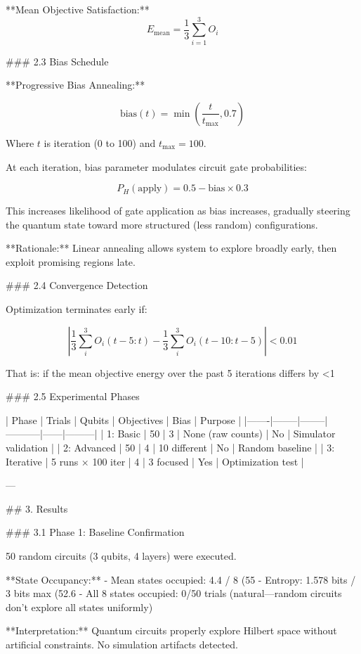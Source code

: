 **Mean Objective Satisfaction:**
\[E_{\text{mean}} = \frac{1}{3} \sum_{i=1}^{3} O_i\]

### 2.3 Bias Schedule

**Progressive Bias Annealing:**

\[\text{bias}(t) = \min\left( \frac{t}{t_{\max}}, 0.7 \right)\]

Where \(t\) is iteration (0 to 100) and \(t_{\max} = 100\).

At each iteration, bias parameter modulates circuit gate probabilities:

\[P_H(\text{apply}) = 0.5 - \text{bias} \times 0.3\]

This increases likelihood of gate application as bias increases, gradually steering the quantum state toward more structured (less random) configurations.

**Rationale:** Linear annealing allows system to explore broadly early, then exploit promising regions late.

### 2.4 Convergence Detection

Optimization terminates early if:

\[\left| \frac{1}{3} \sum_{i}^{3} O_i(t-5:t) - \frac{1}{3} \sum_{i}^{3} O_i(t-10:t-5) \right| < 0.01\]

That is: if the mean objective energy over the past 5 iterations differs by <1%

### 2.5 Experimental Phases

| Phase | Trials | Qubits | Objectives | Bias | Purpose |
|-------|--------|--------|-----------|------|---------|
| 1: Basic | 50 | 3 | None (raw counts) | No | Simulator validation |
| 2: Advanced | 50 | 4 | 10 different | No | Random baseline |
| 3: Iterative | 5 runs × 100 iter | 4 | 3 focused | Yes | Optimization test |

---

## 3. Results

### 3.1 Phase 1: Baseline Confirmation

50 random circuits (3 qubits, 4 layers) were executed.

**State Occupancy:**
- Mean states occupied: 4.4 / 8 (55%
- Entropy: 1.578 bits / 3 bits max (52.6%
- All 8 states occupied: 0/50 trials (natural—random circuits don't explore all states uniformly)

**Interpretation:** Quantum circuits properly explore Hilbert space without artificial constraints. No simulation artifacts detected.

